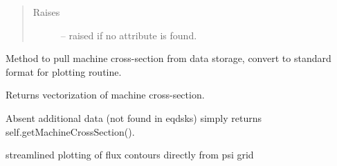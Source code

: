 \documentclass[letterpaper,10pt,english]{sphinxmanual}
\begin{document}
\begin{fulllineitems}
\begin{fulllineitems}
\begin{quote}
\begin{description}
\item[{Raises }] \leavevmode
{} -- 
raised if no attribute is found.

\end{description}\end{quote}

\end{fulllineitems}


\begin{fulllineitems}
\label{eqtools:eqtools.eqdskreader.EqdskReader.getMachineCrossSection}
Method to pull machine cross-section from data storage, convert to standard format for plotting routine.

\end{fulllineitems}


\begin{fulllineitems}
\label{eqtools:eqtools.eqdskreader.EqdskReader.getMachineCrossSectionFull}
Returns vectorization of machine cross-section.

Absent additional data (not found in eqdsks) simply returns self.getMachineCrossSection().

\end{fulllineitems}


\begin{fulllineitems}
\label{eqtools:eqtools.eqdskreader.EqdskReader.plotFlux}
streamlined plotting of flux contours directly from psi grid

\end{fulllineitems}


\end{fulllineitems}
\end{document}
